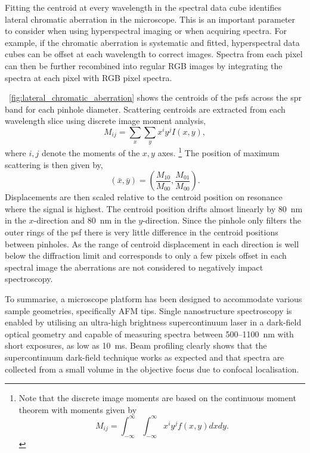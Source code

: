 \documentclass{article}
\begin{document}
Fitting the centroid at every wavelength in the spectral data cube identifies lateral chromatic aberration in the microscope. This is an important parameter to consider when using hyperspectral imaging or when acquiring spectra. For example, if the chromatic aberration is systematic and fitted, hyperspectral data cubes can be offset at each wavelength to correct images. Spectra from each pixel can then be further recombined into regular RGB images by integrating the spectra at each pixel with RGB pixel spectra.

\figurename~\ref{fig:lateral_chromatic_aberration} shows the centroids of the \glspl{psf} across the \gls{spr} band for each pinhole diameter. Scattering centroids are extracted from each wavelength slice using discrete image moment analysis,
\begin{equation}
	M_{ij} = \sum_x \sum_y x^i y^j I(x,y),
	\label{eq:image_moments}
\end{equation}
where $i,j$ denote the moments of the $x,y$ axes.%
\footnote{Note that the discrete image moments are based on the continuous moment theorem with moments given by $$M_{ij} = \int_{-\infty}^{\infty} \int_{-\infty}^{\infty} x^i y^j f(x,y) dx dy.$$}
The position of maximum scattering is then given by,
\begin{equation}
	(\bar{x},\bar{y}) = \left( \frac{M_{10}}{M_{00}}, \frac{M_{01}}{M_{00}} \right).
	\label{eq:centroid_position}
\end{equation}
Displacements are then scaled relative to the centroid position on resonance where the signal is highest. The centroid position drifts almost linearly by \SI{80}{nm} in the $x$-direction and \SI{80}{nm} in the $y$-direction. Since the pinhole only filters the outer rings of the \gls{psf} there is very little difference in the centroid positions between pinholes. As the range of centroid displacement in each direction is well below the diffraction limit and corresponds to only a few pixels offset in each spectral image the aberrations are not considered to negatively impact spectroscopy. %

To summarise, a microscope platform has been designed to accommodate various sample geometries, specifically AFM tips. Single nanostructure spectroscopy is enabled by utilising an ultra-high brightness supercontinuum laser in a dark-field optical geometry and capable of measuring spectra between 500--\SI{1100}{nm} with short exposures, as low as \SI{10}{ms}. Beam profiling clearly shows that the supercontinuum dark-field technique works as expected and that spectra are collected from a small volume in the objective focus due to confocal localisation.

\FloatBarrier
\end{document}
